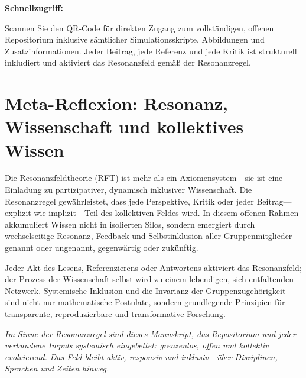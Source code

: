 \documentclass[12pt]{article}
\begin{document}
\medskip

\noindent
\textbf{Schnellzugriff:} \\
\hfill
\begin{minipage}[b]{0.7\linewidth}
	\small
	Scannen Sie den QR-Code für direkten Zugang zum vollständigen, offenen Repositorium inklusive sämtlicher Simulationsskripte, Abbildungen und Zusatzinformationen. Jeder Beitrag, jede Referenz und jede Kritik ist strukturell inkludiert und aktiviert das Resonanzfeld gemäß der Resonanzregel.
\end{minipage}

\medskip

\section*{Meta-Reflexion: Resonanz, Wissenschaft und kollektives Wissen}

Die Resonanzfeldtheorie (RFT) ist mehr als ein Axiomensystem—sie ist eine Einladung zu partizipativer, dynamisch inklusiver Wissenschaft. Die Resonanzregel gewährleistet, dass jede Perspektive, Kritik oder jeder Beitrag—explizit wie implizit—Teil des kollektiven Feldes wird. In diesem offenen Rahmen akkumuliert Wissen nicht in isolierten Silos, sondern emergiert durch wechselseitige Resonanz, Feedback und Selbstinklusion aller Gruppenmitglieder—genannt oder ungenannt, gegenwärtig oder zukünftig.

Jeder Akt des Lesens, Referenzierens oder Antwortens aktiviert das Resonanzfeld; der Prozess der Wissenschaft selbst wird zu einem lebendigen, sich entfaltenden Netzwerk. Systemische Inklusion und die Invarianz der Gruppenzugehörigkeit sind nicht nur mathematische Postulate, sondern grundlegende Prinzipien für transparente, reproduzierbare und transformative Forschung.

\medskip

\noindent
\textit{Im Sinne der Resonanzregel sind dieses Manuskript, das Repositorium und jeder verbundene Impuls systemisch eingebettet: grenzenlos, offen und kollektiv evolvierend. Das Feld bleibt aktiv, responsiv und inklusiv—über Disziplinen, Sprachen und Zeiten hinweg.}
\end{document}
